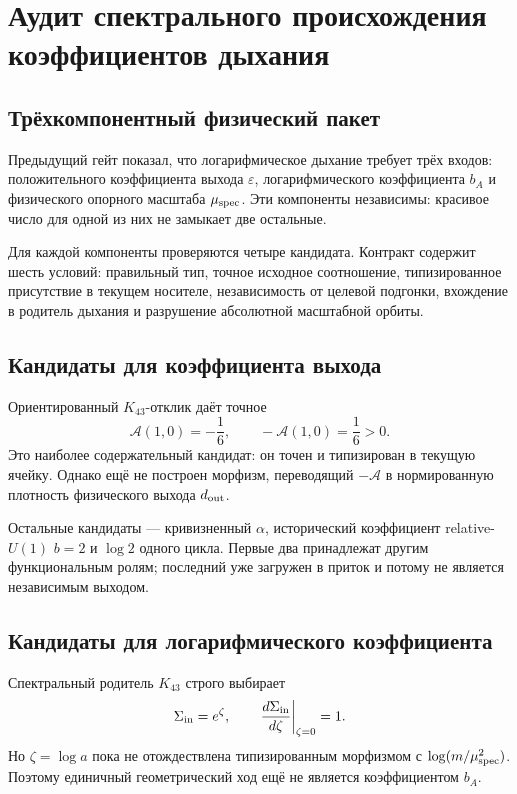 \chapter{Аудит спектрального происхождения коэффициентов дыхания}
\label{ch:v10-breathing-spectral-coefficient-audit}

\section{Трёхкомпонентный физический пакет}

Предыдущий гейт показал, что логарифмическое дыхание требует трёх входов:
положительного коэффициента выхода $\varepsilon$, логарифмического
коэффициента $b_A$ и физического опорного масштаба $\mu_{\rm spec}$.
Эти компоненты независимы: красивое число для одной из них не замыкает две
остальные.

Для каждой компоненты проверяются четыре кандидата. Контракт содержит шесть
условий: правильный тип, точное исходное соотношение, типизированное
присутствие в текущем носителе, независимость от целевой подгонки, вхождение
в родитель дыхания и разрушение абсолютной масштабной орбиты.

\section{Кандидаты для коэффициента выхода}

Ориентированный $K_{43}$-отклик даёт точное
\begin{equation}
 \mathcal A(1,0)=-\frac16,
 \qquad -\mathcal A(1,0)=\frac16>0.
 \label{eq:v10-breathing-audit-trace-magnitude}
\end{equation}
Это наиболее содержательный кандидат: он точен и типизирован в текущую
ячейку. Однако ещё не построен морфизм, переводящий $-\mathcal A$ в
нормированную плотность физического выхода $d_{\rm out}$.

Остальные кандидаты --- кривизненный $\alpha$, исторический коэффициент
relative-$U(1)$ $b=2$ и $\log2$ одного цикла. Первые два принадлежат другим
функциональным ролям; последний уже загружен в приток и потому не является
независимым выходом.

\section{Кандидаты для логарифмического коэффициента}

Спектральный родитель $K_{43}$ строго выбирает
\begin{equation}
 \Sigma_{\rm in}=e^\zeta,
 \qquad
 \left.\frac{d\Sigma_{\rm in}}{d\zeta}\right|_{\zeta=0}=1.
 \label{eq:v10-breathing-audit-unit-beta}
\end{equation}
Но $\zeta=\log a$ пока не отождествлена типизированным морфизмом с
$\log(m/\mu_{\rm spec}^2)$. Поэтому единичный геометрический ход ещё не
является коэффициентом $b_A$.

